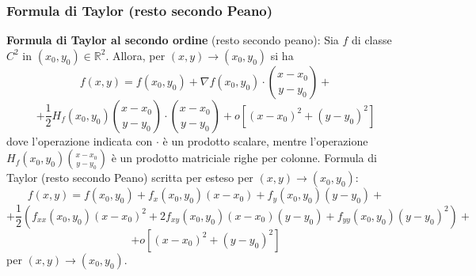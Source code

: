 \subsubsection{Formula di Taylor (resto secondo Peano)}
\textbf{Formula di Taylor al secondo ordine} (resto secondo peano):\newline
Sia $f$ di classe $C^2$ in $(x_0,y_0) \in \mathbb{R}^2$. Allora, per $(x,y) \rightarrow  (x_0, y_0)$ si ha 
\[
    f(x,y) = f(x_0,y_0) + \nabla f(x_0,y_0) \cdot \binom{x-x_0}{y-y_0} + 
\]
\[
    +\frac{1}{2} H_f(x_0,y_0) \binom{x-x_0}{y-y_0} \cdot \binom{x-x_0}{y-y_0} + o[(x-x_0)^2 + (y-y_0)^2]
\]
dove l'operazione indicata con $\cdot $ è un prodotto scalare, mentre l'operazione $H_f(x_0,y_0) \binom{x-x_0}{y-y_0}$ è un prodotto matriciale righe per colonne.
\newline
\newline
Formula di Taylor (resto secondo Peano) scritta per esteso per $(x,y) \rightarrow  (x_0,y_0)$:
\[
    f(x,y) = f(x_0, y_0) + f_x(x_0,y_0)(x-x_0) + f_y(x_0,y_0)(y-y_0) +
\]
\[
    + \frac{1}{2}\left( f_{xx}(x_0,y_0)(x-x_0)^2 + 2f_{xy}(x_0,y_0)(x-x_0)(y-y_0) + f_{yy}(x_0,y_0)(y-y_0)^2 \right) +
\]
\[
    + o[(x-x_0)^2 + (y-y_0)^2]
\]
per $(x,y) \rightarrow (x_0,y_0)$.
